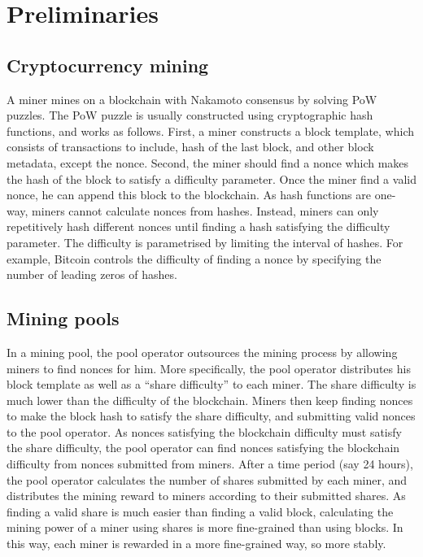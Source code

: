 \section{Preliminaries}

\subsection{Cryptocurrency mining}


A miner mines on a blockchain with Nakamoto consensus by solving PoW puzzles.
The PoW puzzle is usually constructed using cryptographic hash functions, and works as follows.
First, a miner constructs a block template, which consists of transactions to include, hash of the last block, and other block metadata, except the nonce.
Second, the miner should find a nonce which makes the hash of the block to satisfy a difficulty parameter.
Once the miner find a valid nonce, he can append this block to the blockchain.
As hash functions are one-way, miners cannot calculate nonces from hashes.
Instead, miners can only repetitively hash different nonces until finding a hash satisfying the difficulty parameter.
The difficulty is parametrised by limiting the interval of hashes.
For example, Bitcoin controls the difficulty of finding a nonce by specifying the number of leading zeros of hashes.





\subsection{Mining pools}

In a mining pool, the pool operator outsources the mining process by allowing miners to find nonces for him.
More specifically, the pool operator distributes his block template as well as a ``share difficulty'' to each miner.
The share difficulty is much lower than the difficulty of the blockchain.
Miners then keep finding nonces to make the block hash to satisfy the share difficulty, and submitting valid nonces to the pool operator.
As nonces satisfying the blockchain difficulty must satisfy the share difficulty, the pool operator can find nonces satisfying the blockchain difficulty from nonces submitted from miners.
After a time period (say 24 hours), the pool operator calculates the number of shares submitted by each miner, and distributes the mining reward to miners according to their submitted shares.
As finding a valid share is much easier than finding a valid block, calculating the mining power of a miner using shares is more fine-grained than using blocks.
In this way, each miner is rewarded in a more fine-grained way, so more stably.




